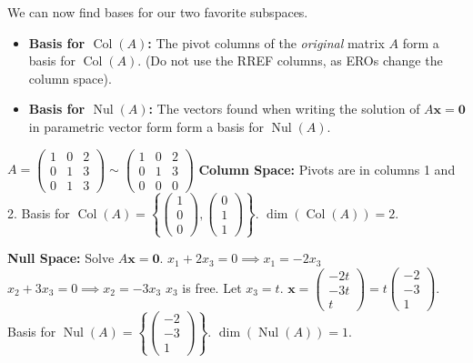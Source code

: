 We can now find bases for our two favorite subspaces.
\begin{itemize}
    \item \textbf{Basis for $\operatorname{Col}(A)$:}
    The pivot columns of the \emph{original} matrix $A$ form a basis for $\operatorname{Col}(A)$.
    (Do not use the RREF columns, as EROs change the column space).
    
    \item \textbf{Basis for $\operatorname{Nul}(A)$:}
    The vectors found when writing the solution of $A\mathbf{x} = \mathbf{0}$ in parametric vector form form a basis for $\operatorname{Nul}(A)$.
\end{itemize}

\begin{example}
$A = \begin{pmatrix} 1 & 0 & 2 \\ 0 & 1 & 3 \\ 0 & 1 & 3 \end{pmatrix} \sim \begin{pmatrix} 1 & 0 & 2 \\ 0 & 1 & 3 \\ 0 & 0 & 0 \end{pmatrix}$
\textbf{Column Space:} Pivots are in columns 1 and 2.
Basis for $\operatorname{Col}(A) = \left\{ \begin{pmatrix} 1 \\ 0 \\ 0 \end{pmatrix}, \begin{pmatrix} 0 \\ 1 \\ 1 \end{pmatrix} \right\}$.
$\dim(\operatorname{Col}(A)) = 2$.

\textbf{Null Space:} Solve $A\mathbf{x} = \mathbf{0}$.
$x_1 + 2x_3 = 0 \implies x_1 = -2x_3$
$x_2 + 3x_3 = 0 \implies x_2 = -3x_3$
$x_3$ is free. Let $x_3 = t$.
$\mathbf{x} = \begin{pmatrix} -2t \\ -3t \\ t \end{pmatrix} = t \begin{pmatrix} -2 \\ -3 \\ 1 \end{pmatrix}$.
Basis for $\operatorname{Nul}(A) = \left\{ \begin{pmatrix} -2 \\ -3 \\ 1 \end{pmatrix} \right\}$.
$\dim(\operatorname{Nul}(A)) = 1$.
\end{example}


